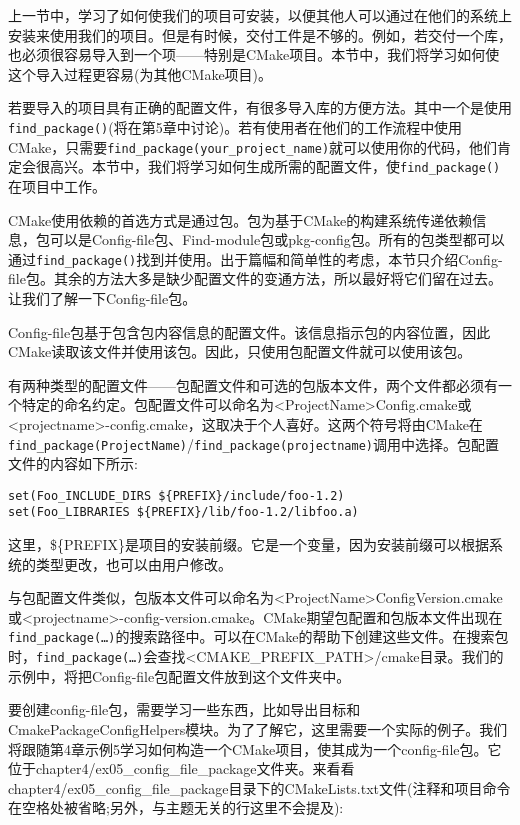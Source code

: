 
上一节中，学习了如何使我们的项目可安装，以便其他人可以通过在他们的系统上安装来使用我们的项目。但是有时候，交付工件是不够的。例如，若交付一个库，也必须很容易导入到一个项——特别是CMake项目。本节中，我们将学习如何使这个导入过程更容易(为其他CMake项目)。

若要导入的项目具有正确的配置文件，有很多导入库的方便方法。其中一个是使用\texttt{find\_package()}(将在第5章中讨论)。若有使用者在他们的工作流程中使用CMake，只需要\texttt{find\_package(your\_project\_name)}就可以使用你的代码，他们肯定会很高兴。本节中，我们将学习如何生成所需的配置文件，使\texttt{find\_package()}在项目中工作。

CMake使用依赖的首选方式是通过包。包为基于CMake的构建系统传递依赖信息，包可以是Config-file包、Find-module包或pkg-config包。所有的包类型都可以通过\texttt{find\_package()}找到并使用。出于篇幅和简单性的考虑，本节只介绍Config-file包。其余的方法大多是缺少配置文件的变通方法，所以最好将它们留在过去。让我们了解一下Config-file包。


Config-file包基于包含包内容信息的配置文件。该信息指示包的内容位置，因此CMake读取该文件并使用该包。因此，只使用包配置文件就可以使用该包。

有两种类型的配置文件——包配置文件和可选的包版本文件，两个文件都必须有一个特定的命名约定。包配置文件可以命名为<ProjectName>Config.cmake或<projectname>-config.cmake，这取决于个人喜好。这两个符号将由CMake在\texttt{find\_package(ProjectName)}/\texttt{find\_package(projectname)}调用中选择。包配置文件的内容如下所示:

\begin{lstlisting}[style=styleCMake]
set(Foo_INCLUDE_DIRS ${PREFIX}/include/foo-1.2)
set(Foo_LIBRARIES ${PREFIX}/lib/foo-1.2/libfoo.a)
\end{lstlisting}

这里，\$\{PREFIX\}是项目的安装前缀。它是一个变量，因为安装前缀可以根据系统的类型更改，也可以由用户修改。

与包配置文件类似，包版本文件可以命名为<ProjectName>ConfigVersion.cmake或<projectname>-config-version.cmake。CMake期望包配置和包版本文件出现在\texttt{find\_package(…)}的搜索路径中。可以在CMake的帮助下创建这些文件。在搜索包时，\texttt{find\_package(…)}会查找<CMAKE\_PREFIX\_PATH>/cmake目录。我们的示例中，将把Config-file包配置文件放到这个文件夹中。

要创建config-file包，需要学习一些东西，比如导出目标和CmakePackageConfigHelpers模块。为了了解它，这里需要一个实际的例子。我们将跟随第4章示例5学习如何构造一个CMake项目，使其成为一个config-file包。它位于chapter4/ex05\_config\_file\_package文件夹。来看看chapter4/ex05\_config\_file\_package目录下的CMakeLists.txt文件(注释和项目命令在空格处被省略;另外，与主题无关的行这里不会提及):

